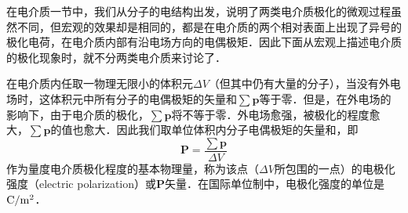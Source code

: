 

在电介质一节中，我们从分子的电结构出发，说明了两类电介质极化的微观过程虽然不同，但宏观的效果却是相同的，都是在电介质的两个相对表面上出现了异号的极化电荷，在电介质内部有沿电场方向的电偶极矩．因此下面从宏观上描述电介质的极化现象时，就不分两类电介质来讨论了．

在电介质内任取一物理无限小的体积元$\Delta V$（但其中仍有大量的分子），当没有外电场时，这体积元中所有分子的电偶极矩的矢量和$\sum \mathbf p$等于零．但是，在外电场的影响下，由于电介质的极化，$\sum \mathbf p$将不等于零．外电场愈强，被极化的程度愈大，$\sum \mathbf p$的值也愈大．因此我们取单位体积内分子电偶极矩的矢量和，即
\begin{equation}
\mathbf P=\frac{\sum \mathbf p}{\Delta V} 
\end{equation}
作为量度电介质极化程度的基本物理量，称为该点（$\Delta V$所包围的一点）的电极化强度（electric polarization）或$\mathbf P$矢量．在国际单位制中，电极化强度的单位是$\rm C/m^2$．